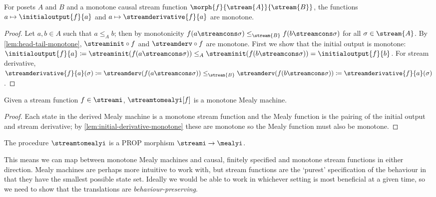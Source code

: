 \begin{lemma}\label{lem:initial-derivative-monotone}
    For posets \(A\) and \(B\) and a monotone causal stream function
    \(\morph{f}{\stream{A}}{\stream{B}}\), the functions
    \(a \mapsto \initialoutput{f}{a}\) and \(a \mapsto \streamderivative{f}{a}\)
    are monotone.
\end{lemma}
\begin{proof}
    Let \(a, b \in A\) such that \(a \leq_A b\); then by monotonicity
    \(f(a \streamcons \sigma) \leq_{\stream{B}} f(b \streamcons \sigma)\) for
    all \(\sigma \in \stream{A}\).
    By \cref{lem:head-tail-monotone}, \(\streaminit \circ f\) and
    \(\streamderv \circ f\) are monotone.
    First we show that the initial output is monotone: \(
    \initialoutput{f}{a} \coloneqq
    \streaminit(f(a \streamcons \sigma)) \leq_{A}
    \streaminit(f(b \streamcons \sigma)) =
    \initialoutput{f}{b}
    \).
    For stream derivative, \(
    \streamderivative{f}{a}(\sigma) \coloneqq
    \streamderv(f(a \streamcons \sigma)) \leq_{\stream{B}}
    \streamderv(f(b \streamcons \sigma)) \coloneqq
    \streamderivative{f}{a}(\sigma)
    \).
\end{proof}

\begin{lemma}\label{lem:stream-to-mealy-is-monotone}
    Given a stream function \(f \in \streami\), \(\streamtomealyi[f]\) is
    a monotone Mealy machine.
\end{lemma}
\begin{proof}
    Each state in the derived Mealy machine is a monotone stream function and
    the Mealy function is the pairing of the initial output and stream
    derivative; by \cref{lem:initial-derivative-monotone} these are monotone so
    the Mealy function must also be monotone.
\end{proof}

\begin{corollary}
    The procedure \(\streamtomealyi\) is a PROP morphism
    \(\streami \to \mealyi\).
\end{corollary}

This means we can map between monotone Mealy machines and causal, finitely
specified and monotone stream functions in either direction.
Mealy machines are perhaps more intuitive to work with, but stream functions
are the `purest' specification of the behaviour in that they have the smallest
possible state set.
Ideally we would be able to work in whichever setting is most beneficial at a
given time, so we need to show that the translations are
\emph{behaviour-preserving}.


